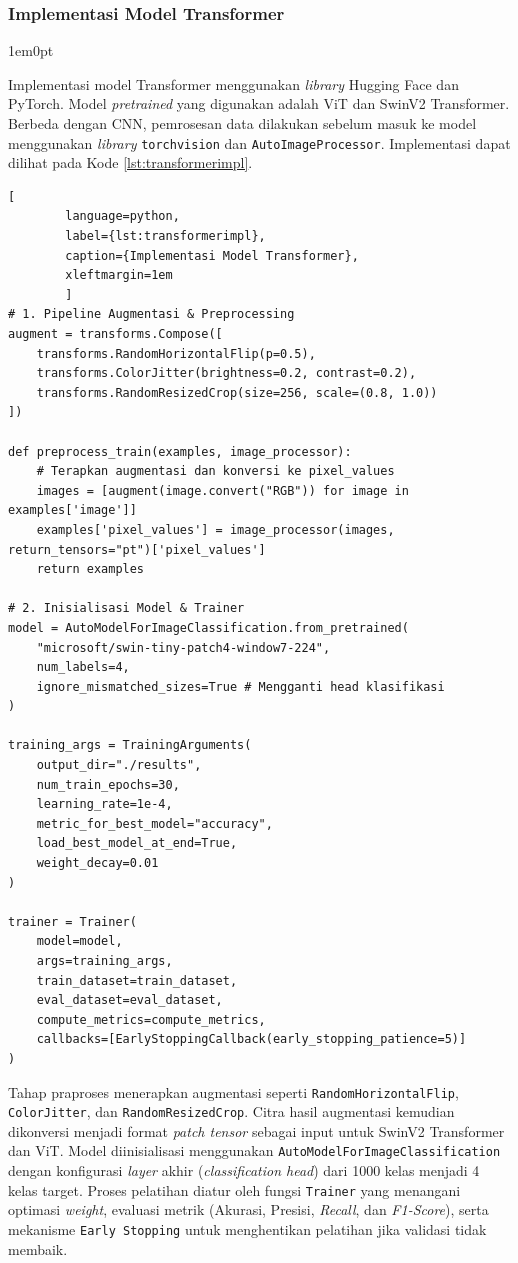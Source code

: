 \subsubsection{Implementasi Model Transformer}

\begin{adjustwidth}{1em}{0pt}
	\begin{sloppypar}
		\hspace{\parindent}Implementasi model Transformer menggunakan \textit{library} Hugging Face dan PyTorch. Model \textit{pretrained} yang digunakan adalah ViT dan SwinV2 Transformer. Berbeda dengan CNN, pemrosesan data dilakukan sebelum masuk ke model menggunakan \textit{library} \texttt{torchvision} dan \texttt{AutoImageProcessor}. Implementasi dapat dilihat pada Kode \ref{lst:transformerimpl}.
	\end{sloppypar}	
	\begin{lstlisting}[
		language=python,
		label={lst:transformerimpl},
		caption={Implementasi Model Transformer},
		xleftmargin=1em
		]
# 1. Pipeline Augmentasi & Preprocessing
augment = transforms.Compose([
	transforms.RandomHorizontalFlip(p=0.5),
	transforms.ColorJitter(brightness=0.2, contrast=0.2),
	transforms.RandomResizedCrop(size=256, scale=(0.8, 1.0))
])

def preprocess_train(examples, image_processor):
	# Terapkan augmentasi dan konversi ke pixel_values
	images = [augment(image.convert("RGB")) for image in examples['image']]
	examples['pixel_values'] = image_processor(images, return_tensors="pt")['pixel_values']
	return examples

# 2. Inisialisasi Model & Trainer
model = AutoModelForImageClassification.from_pretrained(
	"microsoft/swin-tiny-patch4-window7-224",
	num_labels=4,
	ignore_mismatched_sizes=True # Mengganti head klasifikasi
)

training_args = TrainingArguments(
	output_dir="./results",
	num_train_epochs=30,
	learning_rate=1e-4,
	metric_for_best_model="accuracy",
	load_best_model_at_end=True,
	weight_decay=0.01
)

trainer = Trainer(
	model=model,
	args=training_args,
	train_dataset=train_dataset, 
	eval_dataset=eval_dataset,
	compute_metrics=compute_metrics,
	callbacks=[EarlyStoppingCallback(early_stopping_patience=5)]
)
	\end{lstlisting}
	\begin{sloppypar}
		Tahap praproses menerapkan augmentasi seperti \texttt{RandomHorizontalFlip}, \texttt{ColorJitter}, dan \texttt{RandomResizedCrop}. Citra hasil augmentasi kemudian dikonversi menjadi format \textit{patch tensor} sebagai input untuk SwinV2 Transformer dan ViT. Model diinisialisasi menggunakan \texttt{AutoModelForImageClassification} dengan konfigurasi \textit{layer} akhir (\textit{classification head}) dari 1000 kelas menjadi 4 kelas target. Proses pelatihan diatur oleh fungsi \texttt{Trainer} yang menangani optimasi \textit{weight}, evaluasi metrik (Akurasi, Presisi, \textit{Recall}, dan \textit{F1-Score}), serta mekanisme \texttt{Early Stopping} untuk menghentikan pelatihan jika validasi tidak membaik. 
	\end{sloppypar}
\end{adjustwidth}

